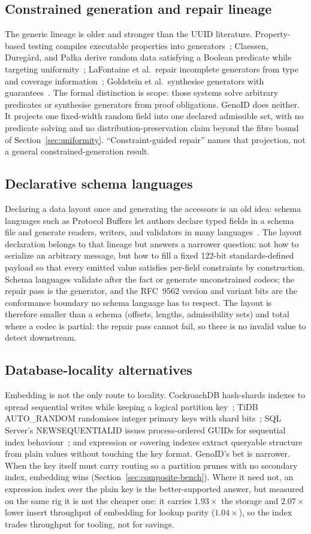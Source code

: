 \documentclass{svproc}
\begin{document}
\subsection{Constrained generation and repair lineage}
The generic lineage is older and stronger than the UUID literature. Property-based testing compiles executable properties into generators~\cite{15}; Claessen, Dureg{\aa}rd, and Pa{\l}ka derive random data satisfying a Boolean predicate while targeting uniformity~\cite{16}; LaFontaine et al.\ repair incomplete generators from type and coverage information~\cite{17}; Goldstein et al.\ synthesise generators with guarantees~\cite{18}. The formal distinction is scope: those systems solve arbitrary predicates or synthesise generators from proof obligations. GenoID does neither. It projects one fixed-width random field into one declared admissible set, with no predicate solving and no distribution-preservation claim beyond the fibre bound of Section~\ref{sec:uniformity}. ``Constraint-guided repair'' names that projection, not a general constrained-generation result.
\subsection{Declarative schema languages}
Declaring a data layout once and generating the accessors is an old idea: schema languages such as Protocol Buffers let authors declare typed fields in a schema file and generate readers, writers, and validators in many languages~\cite{25}. The layout declaration belongs to that lineage but answers a narrower question: not how to serialize an arbitrary message, but how to fill a fixed 122-bit standards-defined payload so that every emitted value satisfies per-field constraints by construction. Schema languages validate after the fact or generate unconstrained codecs; the repair pass is the generator, and the RFC~9562 version and variant bits are the conformance boundary no schema language has to respect. The layout is therefore smaller than a schema (offsets, lengths, admissibility sets) and total where a codec is partial: the repair pass cannot fail, so there is no invalid value to detect downstream.
\subsection{Database-locality alternatives}
Embedding is not the only route to locality. CockroachDB hash-shards indexes to spread sequential writes while keeping a logical partition key~\cite{19}; TiDB AUTO\_RANDOM randomises integer primary keys with shard bits~\cite{20}; SQL Server's NEWSEQUENTIALID issues process-ordered GUIDs for sequential index behaviour~\cite{21}; and expression or covering indexes extract queryable structure from plain values without touching the key format. GenoID's bet is narrower. When the key itself must carry routing so a partition prunes with no secondary index, embedding wins (Section~\ref{sec:composite-bench}). Where it need not, an expression index over the plain key is the better-supported answer, but measured on the same rig it is not the cheaper one: it carries $1.93\times$ the storage and $2.07\times$ lower insert throughput of embedding for lookup parity ($1.04\times$), so the index trades throughput for tooling, not for savings.
\end{document}

